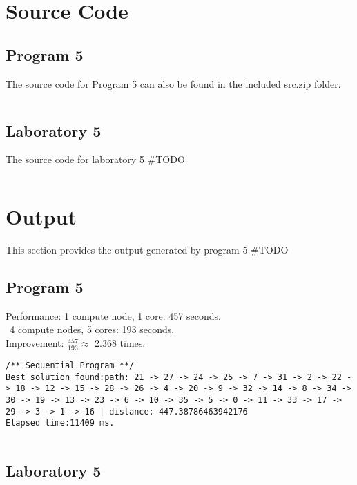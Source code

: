\documentclass{article}
\begin{document}
\pagebreak
	
	\section{Source Code} \label{SRC}
		\subsection{Program 5} \label{P5_SRC}
		The source code for Program 5 can also be found in the included src.zip folder.\\

				\begin{lstlisting}

				\end{lstlisting}
	
		\subsection{Laboratory 5} \label{L5_SRC}
			The source code for laboratory 5 \#TODO\\
			\begin{lstlisting}

			\end{lstlisting}
	
	\section{Output} \label{OUT}
		This section provides the output generated by program 5 \#TODO\\
		
		\subsection{Program 5} \label{P5_OUT}
			Performance: 1 compute node, 1 core: 457 seconds.\\
			\indent\indent\indent\indent $\phantom{:}$4 compute nodes, 5 cores: 193 seconds.\\
			Improvement: $\frac{457}{193} \approx $ 2.368 times.\\
		
			\begin{lstlisting}
/** Sequential Program **/
Best solution found:path: 21 -> 27 -> 24 -> 25 -> 7 -> 31 -> 2 -> 22 -> 18 -> 12 -> 15 -> 28 -> 26 -> 4 -> 20 -> 9 -> 32 -> 14 -> 8 -> 34 -> 30 -> 19 -> 13 -> 23 -> 6 -> 10 -> 35 -> 5 -> 0 -> 11 -> 33 -> 17 -> 29 -> 3 -> 1 -> 16 | distance: 447.38786463942176
Elapsed time:11409 ms.


			\end{lstlisting}


		\subsection{Laboratory 5}\label{L5_OUT}	
\begin{lstlisting}

\end{lstlisting}


	
	
\end{document}
